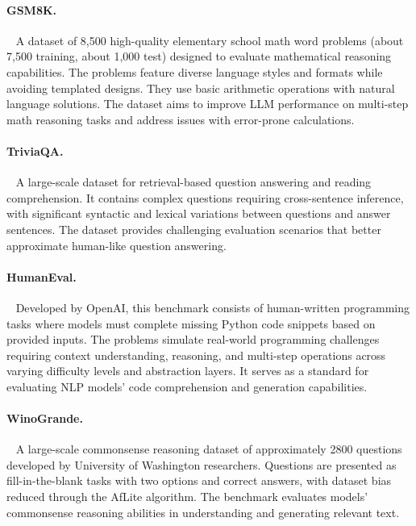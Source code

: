 \paragraph{GSM8K.}~\citep{cobbe2021gsm8k} A dataset of 8,500 high-quality elementary school math word problems (about 7,500 training, about 1,000 test) designed to evaluate mathematical reasoning 
capabilities. The problems feature diverse language styles and formats while avoiding templated designs. They use basic arithmetic operations with natural language solutions. 
The dataset aims to improve LLM performance on multi-step math reasoning tasks and address issues with error-prone calculations.

\paragraph{TriviaQA.}~\citep{joshi2017triviaqa} A large-scale dataset for retrieval-based question answering and reading comprehension. 
It contains complex questions requiring cross-sentence inference, with significant syntactic and lexical variations between questions and answer sentences. 
The dataset provides challenging evaluation scenarios that better approximate human-like question answering.

\paragraph{HumanEval.}~\citep{chen2021humaneval} Developed by OpenAI, this benchmark consists of human-written programming tasks where models must complete missing Python code snippets based on provided inputs. 
The problems simulate real-world programming challenges requiring context understanding, reasoning, and multi-step operations across varying difficulty levels and abstraction layers. 
It serves as a standard for evaluating NLP models' code comprehension and generation capabilities.

\paragraph{WinoGrande.}~\citep{sakaguchi2019winogrande} A large-scale commonsense reasoning dataset of approximately 2800 questions developed by University of Washington researchers. 
Questions are presented as fill-in-the-blank tasks with two options and correct answers, with dataset bias reduced through the AfLite algorithm. 
The benchmark evaluates models' commonsense reasoning abilities in understanding and generating relevant text.

